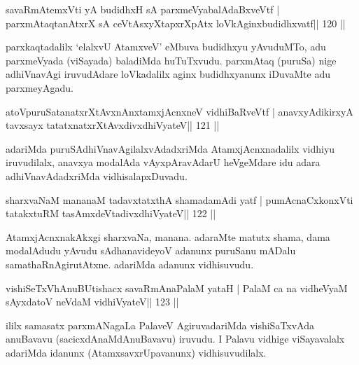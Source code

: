 \begin{shl}
savaRmAtemxVti yA budidhxH sA parxmeVyabalAdaBxveVtf |
parxmAtaqtanAtxrX sA ceVtAsxyXtapxrXpAtx loVkAginxbudidhxvatf\hfill || 120 ||
\end{shl}

\begin{artha}
parxkaqtadalilx `elalxvU AtamxveV' eMbuva budidhxyu yAvuduMTo, adu parxmeVyada (viSayada) baladiMda huTuTxvudu. parxmAtaq (puruSa) nige adhiVnavAgi iruvudAdare loVkadalilx aginx budidhxyanunx iDuvaMte adu parxmeyAgadu.
\end{artha}

\begin{shl}
atoV\s puruSatanatxrXtAvxnAnx\s\s tamxjAcnxneV vidhiBaRveVtf |
anavxyAdikirxyA tavxsayx tatatxnatxrXtAvxdivxdhiVyateV\hfill || 121 ||
\end{shl}

\begin{artha}
adariMda puruSAdhiVnavAgilalxvAdadxriMda AtamxjAcnxnadalilx vidhiyu \-iruvudilalx, anavxya modalAda vAyxpAravAdarU heVgeMdare idu adara adhiVnavAdadxriMda vidhisalapxDuvadu.
\end{artha}


\begin{shl}
sharxvaNaM mananaM tadavxtatxthA shamadamAdi yatf |
pumAcnaCxkonxVti tatakxtuRM tasAmxdeVtadivxdhiVyateV\hfill || 122 ||
\end{shl}

\begin{artha}
AtamxjAcnxnakAkxgi sharxvaNa, manana. adaraMte matutx shama, dama modalAdudu yAvudu sAdhanavideyoV adanunx puruSanu mADalu samathaRnAgirutAtxne. adariMda adanunx vidhisuvudu.
\end{artha}


\begin{shl}
vishiSeTxVhAnuBUtishacx savaRmAnaPalaM yataH |
PalaM ca na vidheVyaM sAyxdatoV neVdaM vidhiVyateV\hfill || 123 ||
\end{shl}

\begin{artha}
ililx samasatx parxmANagaLa PalaveV AgiruvadariMda vishiSaTxvAda anuBavavu (sacicxdAnaMdAnuBavavu) iruvudu. I Palavu vidhige viSayavalalx adariMda idanunx (AtamxsavxrUpavanunx) vidhisuvudilalx.
\end{artha}


